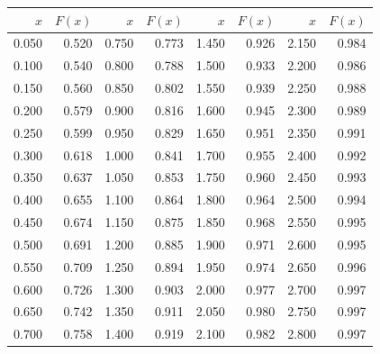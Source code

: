 \documentclass[addpoints, answers]{exam} %
\begin{document}
\begin{figure}[b]
\begin{minipage}[b]{0.35\linewidth}
\begin{tikzpicture}
\end{tikzpicture}
\par\vspace{0pt}
  \end{minipage}%
  \begin{minipage}[b]{0.60\linewidth}
    \centering
\begin{tabular}{rr|rr|rr|rr}
  \hline
$x$ & $F(x)$ & $x$ & $F(x)$ & $x$ & $F(x)$ & $x$ & $F(x)$ \\ 
  \hline
0.050 & 0.520 & 0.750 & 0.773 & 1.450 & 0.926 & 2.150 & 0.984 \\ 
  0.100 & 0.540 & 0.800 & 0.788 & 1.500 & 0.933 & 2.200 & 0.986 \\ 
  0.150 & 0.560 & 0.850 & 0.802 & 1.550 & 0.939 & 2.250 & 0.988 \\ 
  0.200 & 0.579 & 0.900 & 0.816 & 1.600 & 0.945 & 2.300 & 0.989 \\ 
  0.250 & 0.599 & 0.950 & 0.829 & 1.650 & 0.951 & 2.350 & 0.991 \\ 
  0.300 & 0.618 & 1.000 & 0.841 & 1.700 & 0.955 & 2.400 & 0.992 \\ 
  0.350 & 0.637 & 1.050 & 0.853 & 1.750 & 0.960 & 2.450 & 0.993 \\ 
  0.400 & 0.655 & 1.100 & 0.864 & 1.800 & 0.964 & 2.500 & 0.994 \\ 
  0.450 & 0.674 & 1.150 & 0.875 & 1.850 & 0.968 & 2.550 & 0.995 \\ 
  0.500 & 0.691 & 1.200 & 0.885 & 1.900 & 0.971 & 2.600 & 0.995 \\ 
  0.550 & 0.709 & 1.250 & 0.894 & 1.950 & 0.974 & 2.650 & 0.996 \\ 
  0.600 & 0.726 & 1.300 & 0.903 & 2.000 & 0.977 & 2.700 & 0.997 \\ 
  0.650 & 0.742 & 1.350 & 0.911 & 2.050 & 0.980 & 2.750 & 0.997 \\ 
  0.700 & 0.758 & 1.400 & 0.919 & 2.100 & 0.982 & 2.800 & 0.997 \\ 
   \hline
\end{tabular}
\par\vspace{0pt}
\end{minipage}
\label{fig:test}
\end{figure}
\end{document}

